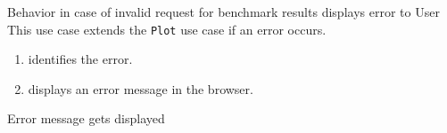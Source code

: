 \bigskip

{Behavior in case of invalid request for \glspl{benchmark result}}
{displays error to User}
{This use case extends the \texttt{Plot} use case if an error occurs.}
{\begin{enumerate}
    \item \parkview{} identifies the error.
    \item \parkview{} displays an error message in the browser.
\end{enumerate}}
{Error message gets displayed}

